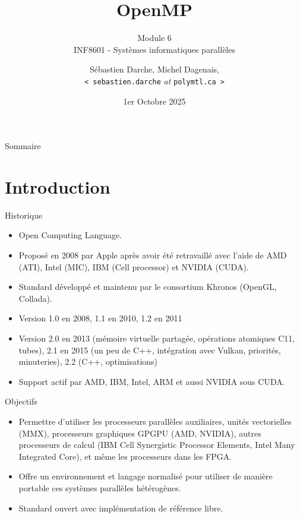 \documentclass[10pt]{beamer}
\begin{document}
\title{OpenMP} 
\subtitle{Module 6 \\
INF8601 - Systèmes informatiques parallèles}
\author{Sébastien Darche, Michel Dagenais, \\\texttt{< sebastien.darche} \textit{at} \texttt{polymtl.ca >}} 
\date{1er Octobre 2025}

\begin{frame}[plain]
  \titlepage
\end{frame}

\begin{frame}{Sommaire}
  \tableofcontents
\end{frame}

\section{Introduction}

\begin{frame}{Historique}

  \begin{itemize}
    \item Open Computing Language.
    \item Proposé en 2008 par Apple après avoir été retravaillé avec l'aide de AMD (ATI), Intel (MIC), IBM (Cell processor) et NVIDIA (CUDA).
    \item Standard développé et maintenu par le consortium Khronos (OpenGL, Collada).
    \item Version 1.0 en 2008, 1.1 en 2010, 1.2 en 2011
    \item Version 2.0 en 2013 (mémoire virtuelle partagée, opérations atomiques C11, tubes), 2.1 en 2015 (un peu de C++, intégration avec Vulkan, priorités, minuteries), 2.2 (C++, optimisations)
    \item Support actif par AMD, IBM, Intel, ARM et aussi NVIDIA sous CUDA.
  \end{itemize}
\end{frame}

\begin{frame}{Objectifs}

  \begin{itemize}
    \item Permettre d'utiliser les processeurs parallèles auxiliaires, unités vectorielles (MMX), processeurs graphiques GPGPU (AMD, NVIDIA), autres processeurs de calcul (IBM Cell Synergistic Processor Elements, Intel Many Integrated Core), et même les processeurs dans les FPGA.

    \item Offre un environnement et langage normalisé pour utiliser de manière portable ces systèmes parallèles hétérogènes.

    \item Standard ouvert avec implémentation de référence libre.
  \end{itemize}
\end{frame}
\end{document}
